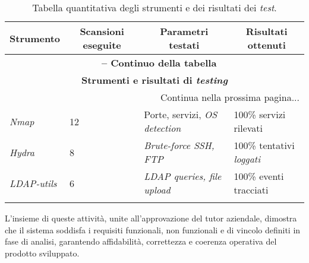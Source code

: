 \begin{center}
\begin{longtable}{|p{}|p{}|p{}|p{}|}
\hline
\multicolumn{1}{|c|}{\textbf{Strumento}} & 
\multicolumn{1}{c|}{\textbf{Scansioni eseguite}} & 
\multicolumn{1}{c|}{\textbf{Parametri testati}} & 
\multicolumn{1}{c|}{\textbf{Risultati ottenuti}} \\ 
\hline
\endfirsthead

\multicolumn{4}{c}{{\bfseries \tablename\ \thetable{} -- Continuo della tabella}}\\
\hline
\multicolumn{4}{|c|}{\textbf{Strumenti e risultati di \textit{testing}}} \\ \hline
\endhead

\hline \multicolumn{4}{|r|}{{Continua nella prossima pagina...}} \\ \hline
\endfoot

\endlastfoot

\textit{Nmap} & 12 & Porte, servizi, \textit{OS detection} & 100\% servizi rilevati \\ \hline
\textit{Hydra} & 8 & \textit{Brute-force SSH, FTP} & 100\% tentativi \textit{loggati} \\ \hline
\textit{LDAP-utils} & 6 & \textit{LDAP queries, file upload} & 100\% eventi tracciati \\ \hline

\caption{Tabella quantitativa degli strumenti e dei risultati dei \textit{test}.}
\label{tab:strumenti-testing}
\end{longtable}
\end{center}

L'insieme di queste attività, unite all'approvazione del tutor aziendale, dimostra che il sistema soddisfa i requisiti funzionali, non funzionali e di vincolo definiti in fase di analisi, garantendo affidabilità, correttezza e coerenza operativa del prodotto sviluppato.
